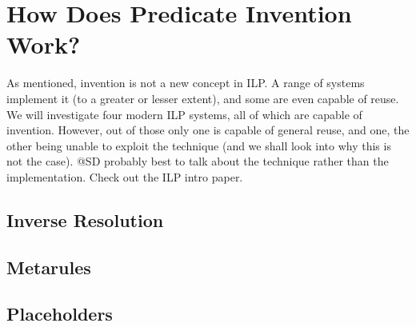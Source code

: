 \section{How Does Predicate Invention Work?}
As mentioned, invention is not a new concept in ILP. A range of systems implement it (to a greater or lesser extent), and some are even capable of reuse. We will investigate four modern ILP systems, all of which are capable of invention. However, out of those only one is capable of general reuse, and one, the other being unable to exploit the technique (and we shall look into why this is not the case).
\ac{@SD probably best to talk about the technique rather than the implementation. Check out the ILP intro paper.}

\subsection{Inverse Resolution}

\subsection{Metarules}

\subsection{Placeholders}


